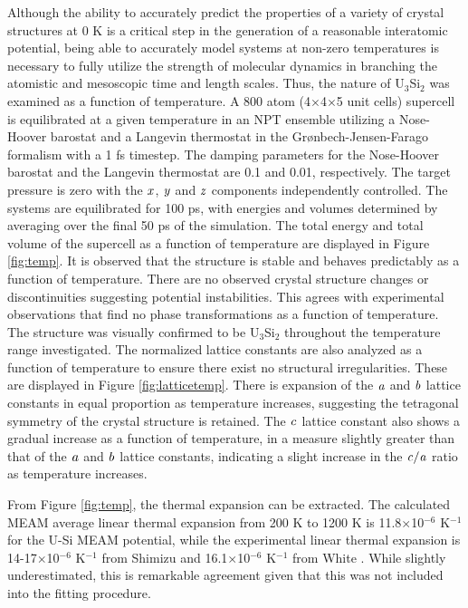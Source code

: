 \documentclass[review]{elsarticle}
\begin{document}
Although the ability to accurately predict the properties of a variety of crystal structures at 0 K is a critical step in the generation of a reasonable interatomic potential, being able to accurately model systems at non-zero temperatures is necessary to fully utilize the strength of molecular dynamics in branching the atomistic and mesoscopic time and length scales.  Thus, the nature of U$_{3}$Si$_{2}$ was examined as a function of temperature.  A 800 atom (4$\times$4$\times$5 unit cells) supercell is equilibrated at a given temperature in an NPT ensemble utilizing a Nose-Hoover barostat and a Langevin thermostat in the Gr{\o}nbech-Jensen-Farago \cite{gjf2013} formalism with a 1 fs timestep.  The damping parameters for the Nose-Hoover barostat and the Langevin thermostat are 0.1 and 0.01, respectively.  The target pressure is zero with the $\it{x}$, $\it{y}$ and $\it{z}$ components independently controlled. The systems are equilibrated for 100 ps, with energies and volumes determined by averaging over the final 50 ps of the simulation.  The total energy and total volume of the supercell as a function of temperature are displayed in Figure \ref{fig:temp}.  It is observed that the structure is stable and behaves predictably as a function of temperature.   There are no observed crystal structure changes or discontinuities suggesting potential instabilities.  This agrees with experimental observations that find no phase transformations as a function of temperature.  The structure was visually confirmed to be U$_{3}$Si$_{2}$ throughout the temperature range investigated.  The normalized lattice constants are also analyzed as a function of temperature to ensure there exist no structural irregularities.  These are displayed in Figure \ref{fig:latticetemp}.  There is expansion of the $\it{a}$ and $\it{b}$ lattice constants in equal proportion as temperature increases, suggesting the tetragonal symmetry of the crystal structure is retained.  The $\it{c}$ lattice constant also shows a gradual increase as a function of temperature, in a measure slightly greater than that of the $\it{a}$ and $\it{b}$ lattice constants, indicating a slight increase in the $\it{c/a}$ ratio as temperature increases.  

From Figure \ref{fig:temp}, the thermal expansion can be extracted.  The calculated MEAM average linear thermal expansion from 200 K to 1200 K is 11.8$\times$10$^{-6}$ K$^{-1}$ for the U-Si MEAM potential, while the experimental linear thermal expansion is 14-17$\times$10$^{-6}$ K$^{-1}$ from Shimizu \cite{shimizu1965} and 16.1$\times$10$^{-6}$ K$^{-1}$ from White \cite{white2015}.  While slightly underestimated, this is remarkable agreement given that this was not included into the fitting procedure.  
\end{document}
